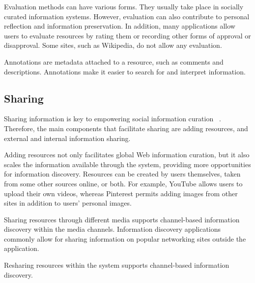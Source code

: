 {{Evaluation methods can have various forms. They usually take place in socially curated information systems. However, evaluation can also contribute to personal reflection and information preservation. In addition, many applications allow users to evaluate resources by rating them or recording other forms of approval or disapproval. Some sites, such as Wikipedia, do not allow any evaluation. 

Annotations are metadata attached to a resource, such as comments and descriptions. Annotations make it easier to search for and interpret information. 
} %

{\subsection{Sharing}
Sharing information is key to empowering social information curation ~\cite{beagrie}. Therefore, the main components that facilitate sharing are adding resources, and external and internal information sharing.

Adding resources not only facilitates global Web information curation, but it also scales the information available through the system, providing more opportunities for information discovery. Resources can be created by users themselves, taken from some other sources online, or both. For example, YouTube allows users to upload their own videos, whereas Pinterest permits adding images from other sites in addition to users' personal images. 

Sharing resources through different media supports channel-based information discovery within the media channels. Information discovery applications commonly allow for sharing information on popular networking sites outside the application.

Resharing resources within the system supports channel-based information discovery. 
} %



} %



